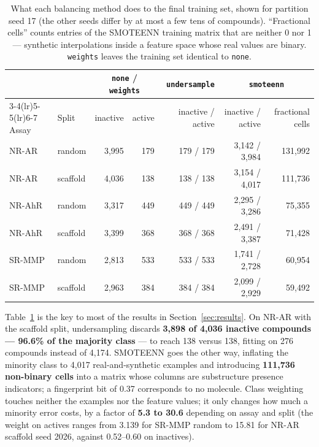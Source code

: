 \documentclass[10pt,letterpaper]{article}
\begin{document}
\begin{table}[!htbp]
\centering
\footnotesize
\caption{What each balancing method does to the final training set, shown for partition seed 17 (the
other seeds differ by at most a few tens of compounds). ``Fractional cells'' counts entries of the
SMOTEENN training matrix that are neither 0 nor 1 --- synthetic interpolations inside a feature
space whose real values are binary. \texttt{weights} leaves the training set identical to
\texttt{none}.}
\label{tab:resample}
\begin{tabular}{@{}llrrrrr@{}}
\toprule
 & & \multicolumn{2}{c}{\texttt{none} / \texttt{weights}} & \texttt{undersample} & \multicolumn{2}{c}{\texttt{smoteenn}} \\
\cmidrule(lr){3-4}\cmidrule(lr){5-5}\cmidrule(lr){6-7}
Assay & Split & inactive & active & inactive / active & inactive / active & fractional cells \\
\midrule
NR-AR  & random   & 3{,}995 & 179 & 179 / 179 & 3{,}142 / 3{,}984 & 131{,}992 \\
NR-AR  & scaffold & 4{,}036 & 138 & 138 / 138 & 3{,}154 / 4{,}017 & 111{,}736 \\
NR-AhR & random   & 3{,}317 & 449 & 449 / 449 & 2{,}295 / 3{,}286 & 75{,}355 \\
NR-AhR & scaffold & 3{,}399 & 368 & 368 / 368 & 2{,}491 / 3{,}387 & 71{,}428 \\
SR-MMP & random   & 2{,}813 & 533 & 533 / 533 & 1{,}741 / 2{,}728 & 60{,}954 \\
SR-MMP & scaffold & 2{,}963 & 384 & 384 / 384 & 2{,}099 / 2{,}929 & 59{,}492 \\
\bottomrule
\end{tabular}
\end{table}

Table~\ref{tab:resample} is the key to most of the results in Section~\ref{sec:results}. On NR-AR
with the scaffold split, undersampling discards \textbf{3{,}898 of 4{,}036 inactive compounds ---
96.6\% of the majority class} --- to reach 138 versus 138, fitting on 276 compounds instead of
4{,}174. SMOTEENN goes the other way, inflating the minority class to 4{,}017 real-and-synthetic
examples and introducing \textbf{111{,}736 non-binary cells} into a matrix whose columns are
substructure presence indicators; a fingerprint bit of 0.37 corresponds to no molecule. Class
weighting touches neither the examples nor the feature values; it only changes how much a minority
error costs, by a factor of \textbf{5.3 to 30.6} depending on assay and split (the weight on actives
ranges from 3.139 for SR-MMP random to 15.81 for NR-AR scaffold seed 2026, against 0.52--0.60 on
inactives).
\end{document}
